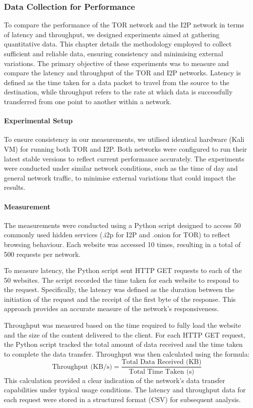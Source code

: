 \documentclass[12pt,conference]{IEEEtran}
\begin{document}
\subsubsection{Data Collection for Performance}
To compare the performance of the TOR network and the I2P network in terms of latency and throughput, we designed experiments aimed at gathering quantitative data. This chapter details the methodology employed to collect sufficient and reliable data, ensuring consistency and minimising external variations. The primary objective of these experiments was to measure and compare the latency and throughput of the TOR and I2P networks. Latency is defined as the time taken for a data packet to travel from the source to the destination, while throughput refers to the rate at which data is successfully transferred from one point to another within a network. 
\paragraph{Experimental Setup}
To ensure consistency in our measurements, we utilised identical hardware (Kali VM) for running both TOR and I2P. Both networks were configured to run their latest stable versions to reflect current performance accurately. The experiments were conducted under similar network conditions, such as the time of day and general network traffic, to minimise external variations that could impact the results.
\paragraph{Measurement} The measurements were conducted using a Python script designed to access 50 commonly used hidden services (.i2p for I2P and .onion for TOR) to reflect browsing behaviour. Each website was accessed 10 times, resulting in a total of 500 requests per network.

To measure latency, the Python script sent HTTP GET requests to each of the 50 websites. The script recorded the time taken for each website to respond to the request. Specifically, the latency was defined as the duration between the initiation of the request and the receipt of the first byte of the response. This approach provides an accurate measure of the network's responsiveness.

Throughput was measured based on the time required to fully load the website and the size of the content delivered to the client. For each HTTP GET request, the Python script tracked the total amount of data received and the time taken to complete the data transfer. Throughput was then calculated using the formula:
\[
\text{Throughput (KB/s)} = \frac{\text{Total Data Received (KB)}}{\text{Total Time Taken (s)}}
\]
This calculation provided a clear indication of the network's data transfer capabilities under typical usage conditions. The latency and throughput data for each request were stored in a structured format (CSV) for subsequent analysis.
\end{document}
